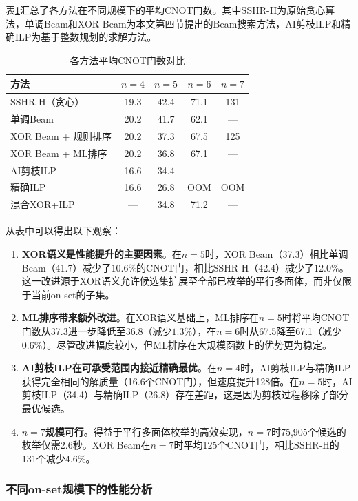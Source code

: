 \documentclass[10.5pt,compsoc,UTF8]{CjC}
\newcommand{\heiti}{\CJKfamily{STHeiti}}
\theoremstyle{mystyle}
\begin{document}
表\ref{tab:ai-sshr-comparison}汇总了各方法在不同规模下的平均CNOT门数。其中SSHR-H为原始贪心算法\cite{zheng2025cnot}，单调Beam和XOR Beam为本文第四节提出的Beam搜索方法，AI剪枝ILP和精确ILP为基于整数规划的求解方法。

\begin{table}[H]
  \centering
  \caption{各方法平均CNOT门数对比}
  \label{tab:ai-sshr-comparison}
  \setlength{\tabcolsep}{5pt}
  \begin{tabular}{lcccc}
    \toprule
    方法 & $n{=}4$ & $n{=}5$ & $n{=}6$ & $n{=}7$ \\
    \midrule
    SSHR-H（贪心） & 19.3 & 42.4 & 71.1 & 131 \\
    单调Beam & 20.2 & 41.7 & 62.1 & --- \\
    XOR Beam + 规则排序 & 20.2 & 37.3 & 67.5 & 125 \\
    XOR Beam + ML排序 & 20.2 & 36.8 & 67.1 & --- \\
    AI剪枝ILP & 16.6 & 34.4 & --- & --- \\
    精确ILP & 16.6 & 26.8 & OOM & OOM \\
    混合XOR+ILP & --- & 34.8 & 71.2 & --- \\
    \bottomrule
  \end{tabular}
\end{table}

从表中可以得出以下观察：
\begin{enumerate}
  \item \textbf{XOR语义是性能提升的主要因素}。在$n=5$时，XOR Beam（37.3）相比单调Beam（41.7）减少了$10.6\%$的CNOT门，相比SSHR-H（42.4）减少了$12.0\%$。这一改进源于XOR语义允许候选集扩展至全部已枚举的平行多面体，而非仅限于当前on-set的子集。
  \item \textbf{ML排序带来额外改进}。在XOR语义基础上，ML排序在$n=5$时将平均CNOT门数从37.3进一步降低至36.8（减少$1.3\%$），在$n=6$时从67.5降至67.1（减少$0.6\%$）。尽管改进幅度较小，但ML排序在大规模函数上的优势更为稳定。
  \item \textbf{AI剪枝ILP在可承受范围内接近精确最优}。在$n=4$时，AI剪枝ILP与精确ILP获得完全相同的解质量（16.6个CNOT门），但速度提升128倍。在$n=5$时，AI剪枝ILP（34.4）与精确ILP（26.8）存在差距，这是因为剪枝过程移除了部分最优候选。
  \item \textbf{$n=7$规模可行}。得益于平行多面体枚举的高效实现，$n=7$时75{,}905个候选的枚举仅需2.6秒。XOR Beam在$n=7$时平均125个CNOT门，相比SSHR-H的131个减少$4.6\%$。
\end{enumerate}

\subsubsection*{\heiti 不同on-set规模下的性能分析}
\end{document}
